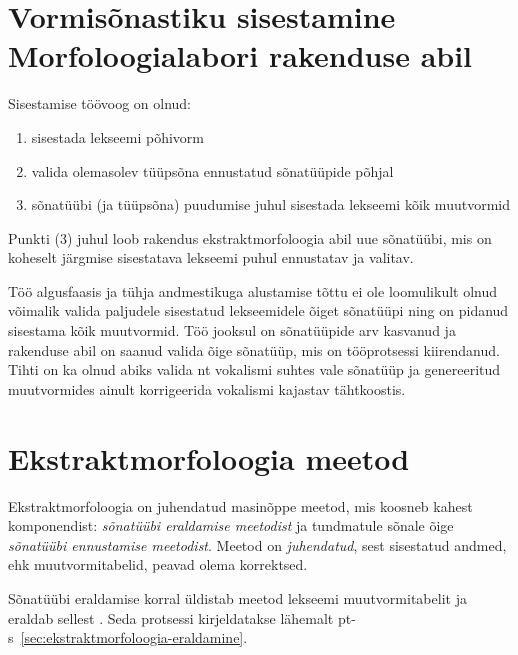 \documentclass[12pt,a4paper]{article}
\begin{document}
\newpage

\section{Vormisõnastiku sisestamine Morfoloogialabori rakenduse abil}
\label{sec:vormisõnastiku-sisestamine}

Sisestamise töövoog on olnud:
\begin{enumerate}
\item sisestada lekseemi põhivorm
\item valida olemasolev tüüpsõna ennustatud sõnatüüpide põhjal
\item sõnatüübi (ja tüüpsõna) puudumise juhul sisestada lekseemi kõik muutvormid
\end{enumerate}

Punkti (3) juhul loob rakendus ekstraktmorfoloogia abil uue sõnatüübi, mis on koheselt järgmise sisestatava lekseemi puhul ennustatav ja valitav.

Töö algusfaasis ja tühja andmestikuga alustamise tõttu ei ole loomulikult olnud võimalik valida paljudele sisestatud lekseemidele õiget sõnatüüpi ning on pidanud sisestama kõik muutvormid. Töö jooksul on sõnatüüpide arv kasvanud ja rakenduse abil on saanud valida õige sõnatüüp, mis on töö\-protsessi kiirendanud. Tihti on ka olnud abiks valida nt vokalismi suhtes vale sõnatüüp ja genereeritud muutvormides ainult korrigeerida vokalismi kajastav tähtkoostis.



\newpage
\section{Ekstraktmorfoloogia meetod}
\label{sec:ekstraktmorfoloogia-meetod}

Ekstraktmorfoloogia on juhendatud masinõppe meetod, mis koosneb kahest komponendist: \emph{sõnatüübi eraldamise meetodist} ja tundmatule sõnale õige \emph{sõnatüübi ennustamise meetodist}. Meetod on \textit{juhendatud}, sest sisestatud andmed, ehk muutvormi\-tabelid, peavad olema korrektsed.


Sõnatüübi eraldamise korral üldistab meetod lekseemi muutvormitabelit ja eraldab sellest . Seda protsessi kirjeldatakse lähemalt pt-s~\ref{sec:ekstraktmorfoloogia-eraldamine}. %
\end{document}
